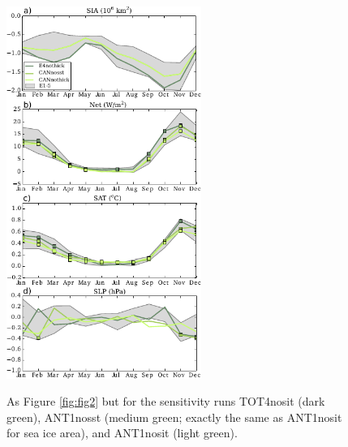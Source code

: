 \documentclass[twocol]{ametsoc}
\begin{document}
\begin{figure}[t]
  \noindent\includegraphics[width=15pc,angle=0]{seacyclessens.pdf}\\
  \caption{As Figure \ref{fig:fig2} but for the sensitivity runs TOT4nosit (dark green), ANT1nosst (medium green; exactly the same as ANT1nosit for sea ice area), and ANT1nosit (light green). 
}\label{fig:fig2b}
\end{figure} %
\end{document}

